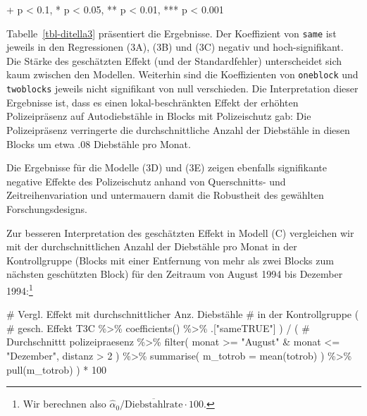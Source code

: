 \documentclass[
  a4paper,
  DIV=11,
  oneside]{scrreprt}
\newenvironment{Shaded}{\begin{snugshade}}{\end{snugshade}}
\newcommand{\AttributeTok}[1]{\textcolor[rgb]{0.40,0.45,0.13}{#1}}
\newcommand{\CommentTok}[1]{\textcolor[rgb]{0.37,0.37,0.37}{#1}}
\newcommand{\DecValTok}[1]{\textcolor[rgb]{0.68,0.00,0.00}{#1}}
\newcommand{\FunctionTok}[1]{\textcolor[rgb]{0.28,0.35,0.67}{#1}}
\newcommand{\NormalTok}[1]{\textcolor[rgb]{0.00,0.23,0.31}{#1}}
\newcommand{\SpecialCharTok}[1]{\textcolor[rgb]{0.37,0.37,0.37}{#1}}
\newcommand{\StringTok}[1]{\textcolor[rgb]{0.13,0.47,0.30}{#1}}
\begin{document}
\begin{minipage}{\linewidth}
+ p < 0.1, * p < 0.05, ** p < 0.01, *** p < 0.001\\
\end{minipage}

Tabelle~\ref{tbl-ditella3} präsentiert die Ergebnisse. Der Koeffizient
von \texttt{same} ist jeweils in den Regressionen (3A), (3B) und (3C)
negativ und hoch-signifikant. Die Stärke des geschätzten Effekt (und der
Standardfehler) unterscheidet sich kaum zwischen den Modellen. Weiterhin
sind die Koeffizienten von \texttt{oneblock} und \texttt{twoblocks}
jeweils nicht signifikant von null verschieden. Die Interpretation
dieser Ergebnisse ist, dass es einen lokal-beschränkten Effekt der
erhöhten Polizeipräsenz auf Autodiebstähle in Blocks mit Polizeischutz
gab: Die Polizeipräsenz verringerte die durchschnittliche Anzahl der
Diebstähle in diesen Blocks um etwa \(.08\) Diebstähle pro Monat.

Die Ergebnisse für die Modelle (3D) und (3E) zeigen ebenfalls
signifikante negative Effekte des Polizeischutz anhand von Querschnitts-
und Zeitreihenvariation und untermauern damit die Robustheit des
gewählten Forschungsdesigns.

Zur besseren Interpretation des geschätzten Effekt in Modell (C)
vergleichen wir mit der durchschnittlichen Anzahl der Diebstähle pro
Monat in der Kontrollgruppe (Blocks mit einer Entfernung von mehr als
zwei Blocks zum nächsten geschützten Block) für den Zeitraum von August
1994 bis Dezember 1994:\footnote{Wir berechnen also
  \(\widehat{\alpha}_0 / \overline{\text{Diebstahlrate}} \cdot 100\).}

\begin{Shaded}
\begin{Highlighting}[]
\CommentTok{\# Vergl. Effekt mit durchschnittlicher Anz. Diebstähle }
\CommentTok{\# in der Kontrollgruppe}
\NormalTok{( }
  \CommentTok{\# gesch. Effekt}
\NormalTok{  T3C }\SpecialCharTok{\%\textgreater{}\%} 
    \FunctionTok{coefficients}\NormalTok{() }\SpecialCharTok{\%\textgreater{}\%} 
\NormalTok{    .[}\StringTok{"sameTRUE"}\NormalTok{] }
\NormalTok{) }\SpecialCharTok{/} 
\NormalTok{  ( }\CommentTok{\# Durchschnittt}
\NormalTok{    polizeipraesenz }\SpecialCharTok{\%\textgreater{}\%} 
      \FunctionTok{filter}\NormalTok{(}
\NormalTok{        monat }\SpecialCharTok{\textgreater{}=} \StringTok{"August"} \SpecialCharTok{\&}\NormalTok{ monat }\SpecialCharTok{\textless{}=} \StringTok{"Dezember"}\NormalTok{,}
\NormalTok{        distanz }\SpecialCharTok{\textgreater{}} \DecValTok{2}
\NormalTok{      ) }\SpecialCharTok{\%\textgreater{}\%}
      \FunctionTok{summarise}\NormalTok{(}
        \AttributeTok{m\_totrob =} \FunctionTok{mean}\NormalTok{(totrob)}
\NormalTok{      ) }\SpecialCharTok{\%\textgreater{}\%} 
      \FunctionTok{pull}\NormalTok{(m\_totrob)}
\NormalTok{  ) }\SpecialCharTok{*} \DecValTok{100}
\end{Highlighting}
\end{Shaded}
\end{document}
